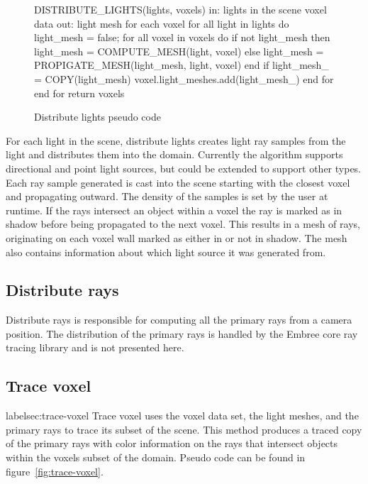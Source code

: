 \begin{figure}[!htb]
\begin{algorithm}
DISTRIBUTE_LIGHTS(lights, voxels) 
  in:  lights in the scene
       voxel data
  out: light mesh for each voxel
  for all light in lights do
    light_mesh = false;
    for all voxel in voxels do 
      if not light_mesh then
        light_mesh = 
          COMPUTE_MESH(light, voxel)
      else
        light_mesh = 
          PROPIGATE_MESH(light_mesh, 
                       light, voxel)
      end if
      light_mesh_ = COPY(light_mesh)
      voxel.light_meshes.add(light_mesh_)
    end for
  end for
return voxels
\end{algorithm}
\caption{Distribute lights pseudo code}
\label{fig:distribute-lights}
\end{figure}

For each light in the scene, distribute lights creates light ray samples from
the light and distributes them into the domain.  Currently the algorithm 
supports directional and point light sources, but could be extended to support 
other types.  Each ray sample generated is cast into the scene starting with the
closest voxel and propagating outward.  The density of the samples is set by the
user at runtime.  If the rays intersect an object within a voxel the ray is 
marked as in shadow before being propagated to the next voxel.  This results in 
a mesh of rays, originating on each voxel wall marked as either in or not in
shadow.  The mesh also contains information about which light source it was 
generated from.  

\subsection{Distribute rays}
Distribute rays is responsible for computing all the primary rays from a camera
position.  The distribution of the primary rays is handled by the Embree core
ray tracing library and is not presented here.

\subsection{Trace voxel}
label{sec:trace-voxel}
Trace voxel uses the voxel data set, the light meshes, and the primary rays to 
trace its subset of the scene.  This method produces a traced copy of the 
primary rays with color information on the rays that intersect objects within 
the voxels subset of the domain.  Pseudo code can be found in 
figure~\ref{fig:trace-voxel}.

